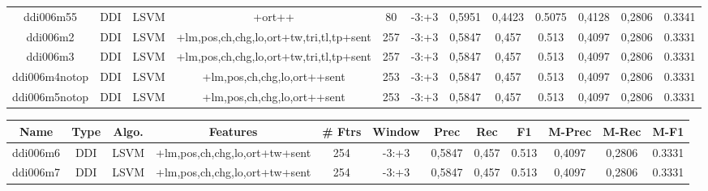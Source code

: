 \documentclass[a4paper]{article}
\begin{document}
\begin{landscape}
\begin{center}
\begin{tabular}{ |c|c|c|c|c|c|c|c|c|c|c|c|}
 
 	
 	\small{ ddi006m55 } & \small{ DDI} & \small{  LSVM }  & +ort++  &  80 &  \small{  -3:+3 }  &  0,5951 & 0,4423 & 0.5075  &  0,4128 & 0,2806 & 0.3341 \\
 	

 
 	
 	\small{ ddi006m2 } & \small{ DDI} & \small{  LSVM }  & +lm,pos,ch,chg,lo,ort+tw,tri,tl,tp+sent  &  257 &  \small{  -3:+3 }  &  0,5847 & 0,457 & 0.513  &  0,4097 & 0,2806 & 0.3331 \\
 	

 
 	
 	\small{ ddi006m3 } & \small{ DDI} & \small{  LSVM }  & +lm,pos,ch,chg,lo,ort+tw,tri,tl,tp+sent  &  257 &  \small{  -3:+3 }  &  0,5847 & 0,457 & 0.513  &  0,4097 & 0,2806 & 0.3331 \\
 	

 
 	
 	\small{ ddi006m4notop } & \small{ DDI} & \small{  LSVM }  & +lm,pos,ch,chg,lo,ort++sent  &  253 &  \small{  -3:+3 }  &  0,5847 & 0,457 & 0.513  &  0,4097 & 0,2806 & 0.3331 \\
 	

 
 	
 	\small{ ddi006m5notop } & \small{ DDI} & \small{  LSVM }  & +lm,pos,ch,chg,lo,ort++sent  &  253 &  \small{  -3:+3 }  &  0,5847 & 0,457 & 0.513  &  0,4097 & 0,2806 & 0.3331 \\
 	
 \hline
\end{tabular}
\end{center}




\begin{center}
\begin{tabular}{ |c|c|c|c|c|c|c|c|c|c|c|c|} 
 \hline
 	Name & Type & Algo. & Features & \# Ftrs & Window & Prec & Rec & F1 & M-Prec & M-Rec & M-F1\\
 \hline

 	

 
 	
 	\small{ ddi006m6 } & \small{ DDI} & \small{  LSVM }  & +lm,pos,ch,chg,lo,ort+tw+sent  &  254 &  \small{  -3:+3 }  &  0,5847 & 0,457 & 0.513  &  0,4097 & 0,2806 & 0.3331 \\
 	

 
 	
 	\small{ ddi006m7 } & \small{ DDI} & \small{  LSVM }  & +lm,pos,ch,chg,lo,ort+tw+sent  &  254 &  \small{  -3:+3 }  &  0,5847 & 0,457 & 0.513  &  0,4097 & 0,2806 & 0.3331 \\
 	


\end{tabular}
\end{center}
\end{landscape}
\end{document}
